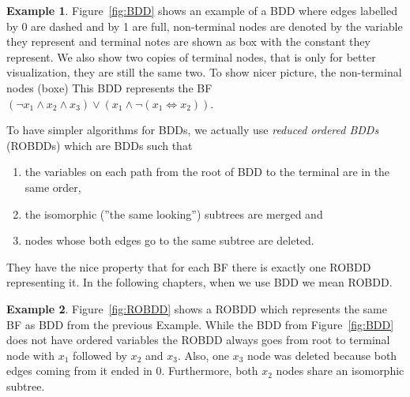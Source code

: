 \documentclass[
  digital, %
  twoside, %
  table,   %
  nolof,     %
  nolot,     %
]{fithesis3}
\theoremstyle{definition}
\newtheorem{example}{Example}
\theoremstyle{remark}
\newcommand{\lequal}{\Leftrightarrow}
\begin{document}
\begin{example}
Figure~\ref{fig:BDD} shows an example of a BDD where edges labelled by 0 are dashed and by 1 are full, non-terminal nodes are denoted by the variable they represent and terminal notes are shown as box with the constant they represent. We also show two copies of terminal nodes, that is only for better visualization, they are still the same two. To show nicer picture, the non-terminal nodes (boxe) This BDD represents the BF $(\neg x_1 \land x_2 \land x_3) \lor (x_1 \land \neg (x_1 \lequal x_2))$. 
\end{example}

To have simpler algorithms for BDDs, we actually use \emph{reduced ordered BDDs} (ROBDDs) which are BDDs such that 
\begin{enumerate}
    \item the variables on each path from the root of BDD to the terminal are in the same order,
    \item the isomorphic (''the same looking'') subtrees are merged and
    \item nodes whose both edges go to the same subtree are deleted.
\end{enumerate}
They have the nice property that for each BF there is exactly one ROBDD representing it. In the following chapters, when we use BDD we mean ROBDD.

\begin{example}
Figure~\ref{fig:ROBDD} shows a ROBDD which represents the same BF as BDD from the previous Example. While the BDD from Figure~\ref{fig:BDD} does not have ordered variables the ROBDD always goes from root to terminal node with $x_1$ followed by $x_2$ and $x_3$. Also, one $x_3$ node was deleted because both edges coming from it ended in $0$. Furthermore, both $x_2$ nodes share an isomorphic subtree.
\end{example}


\end{document}
